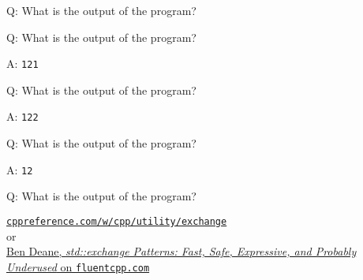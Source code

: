 \begin{frame}[fragile]{Q: What is the output of the program?}

\end{frame}

\begin{frame}[fragile]{Q: What is the output of the program?}
\end{frame}

\addtocounter{framenumber}{-1}
\begin{frame}[fragile]{A: \texttt{121}}
\end{frame}

\begin{frame}[fragile]{Q: What is the output of the program?}
\end{frame}

\addtocounter{framenumber}{-1}
\begin{frame}[fragile]{A: \texttt{122}}
\end{frame}

\begin{frame}[fragile]{Q: What is the output of the program?}
\end{frame}

\addtocounter{framenumber}{-1}
\begin{frame}[fragile]{A: \texttt{12}}
\end{frame}

\begin{frame}[fragile]{Q: What is the output of the program?}

    \footnotesize
    \begin{center}
    \href{https://en.cppreference.com/w/cpp/utility/exchange}{\texttt{cppreference.com/w/cpp/utility/exchange}} \\
    or \\
    \href{https://www.fluentcpp.com/2020/09/25/stdexchange-patterns-fast-safe-expressive-and-probably-underused/}{Ben Deane, \textit{std::exchange Patterns: Fast, Safe, Expressive, and Probably Underused} on \texttt{fluentcpp.com}}
    \end{center}
\end{frame}


